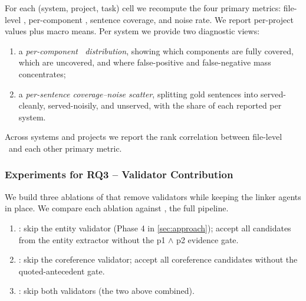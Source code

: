 For each (system, project, task) cell we recompute the four primary metrics: file-level \fone, per-component \fone, sentence coverage, and noise rate. We report per-project values plus macro means. Per system we provide two diagnostic views:
\begin{enumerate}[leftmargin=*]
    \item a \emph{per-component \fone\ distribution}, showing which components are fully covered, which are uncovered, and where false-positive and false-negative mass concentrates;
    \item a \emph{per-sentence coverage--noise scatter}, splitting gold sentences into served-cleanly, served-noisily, and unserved, with the share of each reported per system.
\end{enumerate}
Across systems and projects we report the rank correlation between file-level \fone\ and each other primary metric.


\subsubsection{Experiments for RQ3 -- Validator Contribution}
\label{sec:exp:rq3}
We build three ablations of \approach{} that remove validators while keeping the linker agents in place. 
We compare each ablation against \emph{\fullVariant{}}, the full pipeline.

\begin{enumerate}[leftmargin=*]
\item \emph{\noEntityValid{}}: skip the entity validator (Phase 4 in \autoref{sec:approach}); accept all candidates from the entity extractor without the p1 \ensuremath{\wedge} p2 evidence gate.

\item \emph{\noCitation{}}: skip the coreference validator; accept all coreference candidates without the quoted-antecedent gate.

\item \emph{\noValidator{}}: skip both validators (the two above combined).
\end{enumerate}

